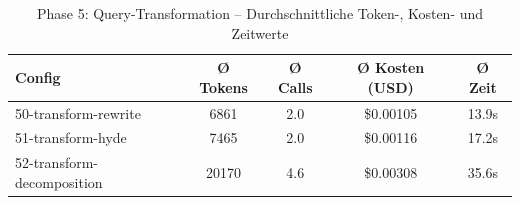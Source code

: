 \begin{table}[H]
\centering
\small
\begin{tabular}{lcccc}
\toprule
Config & Ø Tokens & Ø Calls & Ø Kosten (USD) & Ø Zeit \\
\midrule
50-transform-rewrite & 6861 & 2.0 & \$0.00105 & 13.9s \\
51-transform-hyde & 7465 & 2.0 & \$0.00116 & 17.2s \\
52-transform-decomposition & 20170 & 4.6 & \$0.00308 & 35.6s \\
\bottomrule
\end{tabular}
\caption{Phase 5: Query-Transformation -- Durchschnittliche Token-, Kosten- und Zeitwerte}
\label{tab:phase5_cost}
\end{table}
